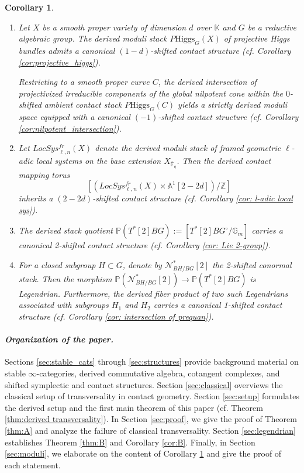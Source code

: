 \documentclass[reqno]{amsart}
\newtheorem{corollary}[theorem]{Corollary}
\theoremstyle{definition}
\theoremstyle{remark}
\newcommand{\Gm}{\mathbb{G}_m}
\newcommand{\K}{\mathbb{K}}
\newcommand{\bfem}[1]{\textbf{\textit{#1}}}
\begin{document}
\begin{corollary} \label{cor:C}
    \begin{enumerate} \itemsep=5pt
        \item Let $X$ be a smooth proper variety of dimension $d$ over $\K$ and $G$ be a reductive algebraic group. The derived moduli stack $P\mathrm{Higgs}_G(X)$ of projective Higgs bundles admits a canonical $(1-d)$-shifted contact structure (cf. Corollary \ref{cor:projective_higgs}). 
        
        Restricting to a smooth proper curve $C$, the derived intersection of projectivized irreducible components of the global nilpotent cone within the $0$-shifted ambient contact stack $P\mathrm{Higgs}_G(C)$ yields a strictly derived moduli space equipped with a canonical $(-1)$-shifted contact structure (cf. Corollary \ref{cor:nilpotent_intersection}).
        \item Let $LocSys_{\ell,n}^{fr}(X)$ denote the \textit{derived moduli stack of framed geometric $\ell$-adic local systems on the base extension $X_{\bar{\mathbb{F}}_q}$}. Then the derived contact mapping torus $$\left[(LocSys_{\ell,n}^{fr}(X) \times \mathbb{A}^1[2-2d]) / \mathbb{Z}\right]$$ inherits a $(2-2d)$-shifted contact structure (cf. Corollary \ref{cor: l-adic local sys}).        \item The derived stack quotient $\mathbb{P}(T^*[2]BG) := [T^*[2]BG^\circ / \Gm]$   carries a canonical 2-shifted contact structure (cf. Corollary \ref{cor: Lie 2-group}).
        \item For a closed subgroup $H \subset G$, denote by $\mathcal{N}^*_{BH/BG}[2]$ the 2-shifted conormal stack. Then  the morphism $\mathbb{P}(\mathcal{N}^*_{BH/BG}[2]) \to \mathbb{P}(T^*[2]BG)$ is Legendrian. Furthermore, the derived fiber product of two such Legendrians associated with subgroups $H_1$ and $H_2$ carries a canonical 1-shifted contact structure (cf. Corollary \ref{cor: intersection of prequan}).
    \end{enumerate}
\end{corollary}

\vspace{0.1in}
\paragraph{\bfem{Organization of the paper.}}  Sections \ref{sec:stable_cats} through
\ref{sec:structures} provide background material on stable
$\infty$-categories, derived commutative algebra, cotangent
complexes, and shifted symplectic and contact structures. Section
\ref{sec:classical} overviews the classical setup of transversality
in contact geometry. Section
\ref{sec:setup} formulates the derived setup and the first main theorem of this paper (cf. Theorem \ref{thm:derived transversality}). In
Section \ref{sec:proof}, we give the proof of Theorem \ref{thm:A} and
analyze the failure of classical transversality.  Section
\ref{sec:legendrian} establishes  Theorem \ref{thm:B} and Corollary \ref{cor:B}. Finally, in Section \ref{sec:moduli}, we elaborate on the content of Corollary \ref{cor:C} and give the proof of each statement.
\end{document}
